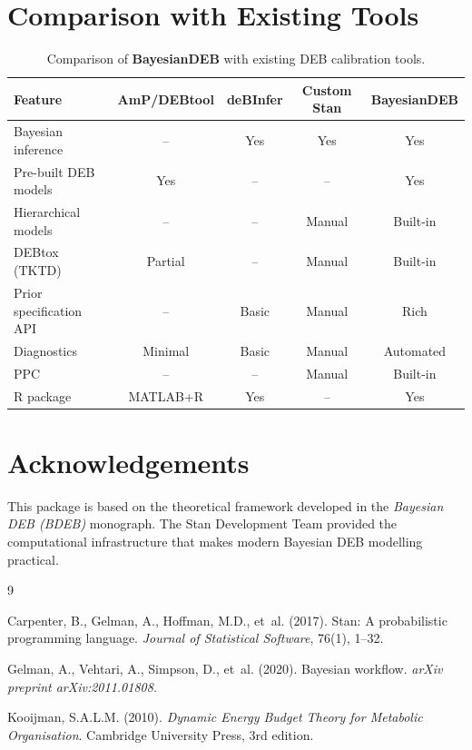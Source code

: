 \documentclass[11pt,a4paper]{article}
\newcommand{\pkg}[1]{\textbf{#1}}
\newcommand{\R}{\textsf{R}}
\begin{document}
\section{Comparison with Existing Tools}
\label{sec:comparison}

\begin{table}[htbp]
\centering
\caption{Comparison of \pkg{BayesianDEB} with existing DEB calibration tools.}
\label{tab:comparison}
\begin{tabular}{lcccc}
\toprule
\textbf{Feature} & \textbf{AmP/DEBtool} & \textbf{deBInfer} & \textbf{Custom Stan} & \textbf{BayesianDEB} \\
\midrule
Bayesian inference      & --          & Yes & Yes & Yes \\
Pre-built DEB models    & Yes         & --  & --  & Yes \\
Hierarchical models     & --          & --  & Manual & Built-in \\
DEBtox (TKTD)           & Partial     & --  & Manual & Built-in \\
Prior specification API & --          & Basic & Manual & Rich \\
Diagnostics             & Minimal     & Basic & Manual & Automated \\
PPC                     & --          & --  & Manual & Built-in \\
\R{} package            & MATLAB+\R{} & Yes & --  & Yes \\
\bottomrule
\end{tabular}
\end{table}


\section*{Acknowledgements}

This package is based on the theoretical framework developed in the
\textit{Bayesian DEB (BDEB)} monograph.  The Stan Development Team
provided the computational infrastructure that makes modern Bayesian
DEB modelling practical.

\begin{thebibliography}{9}

Carpenter, B., Gelman, A., Hoffman, M.D., et~al. (2017).
\newblock Stan: A probabilistic programming language.
\newblock \textit{Journal of Statistical Software}, 76(1), 1--32.

Gelman, A., Vehtari, A., Simpson, D., et~al. (2020).
\newblock Bayesian workflow.
\newblock \textit{arXiv preprint arXiv:2011.01808}.

Kooijman, S.A.L.M. (2010).
\newblock \textit{Dynamic Energy Budget Theory for Metabolic Organisation}.
\newblock Cambridge University Press, 3rd edition.

\end{thebibliography}
\end{document}
